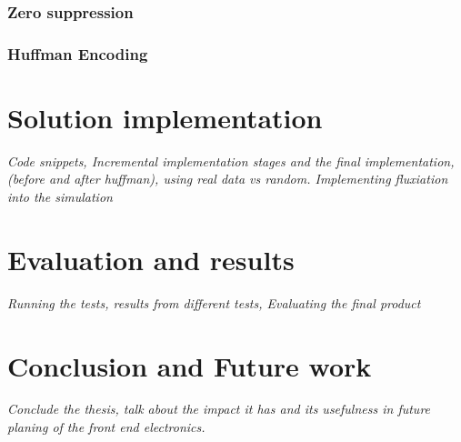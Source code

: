 \documentclass[a4paper]{report}
\begin{document}
\subsection{Zero suppression} %
\subsection{Huffman Encoding} %

\chapter{Solution implementation}
\textit{Code snippets, Incremental implementation stages and the final implementation, (before and after huffman), using real data vs random. Implementing fluxiation into the simulation}

\chapter{Evaluation and results}
\textit{Running the tests, results from different tests, Evaluating the final product}

\chapter{Conclusion and Future work}
\textit{Conclude the thesis, talk about the impact it has and its usefulness in future planing of the front end electronics.}

{}

\end{document}
